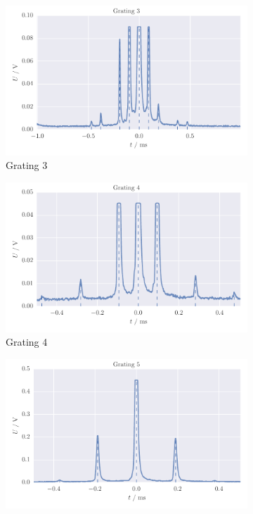 \begin{figure}[H]
    \begin{subfigure}[b]{\mpltw}
        \includegraphics[width=\textwidth]{figures/gratings_maxi3}
        \caption{Grating 3}
        \label{fig:gratings_maxi1}
    \end{subfigure}\quad
    \begin{subfigure}[b]{\mpltw}
        \includegraphics[width=\textwidth]{figures/gratings_maxi4}
        \caption{Grating 4}
        \label{fig:gratings_maxi1}
    \end{subfigure}
    \begin{subfigure}[b]{\mpltw}
        \includegraphics[width=\textwidth]{figures/gratings_maxi5}

\end{subfigure}
\end{figure}

